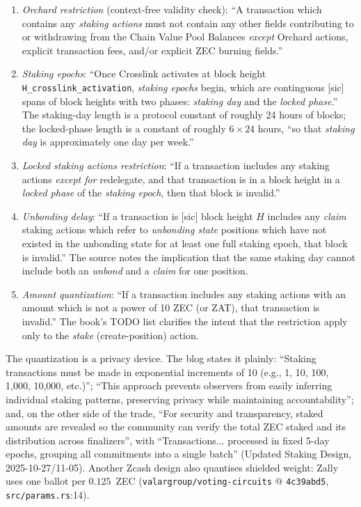 \documentclass[11pt,a4paper]{article}
\theoremstyle{definition}
\begin{document}
\begin{enumerate}
\item \emph{Orchard restriction} (context-free validity check): ``A
  transaction which contains any \emph{staking actions} must not contain
  any other fields contributing to or withdrawing from the Chain Value
  Pool Balances \emph{except} Orchard actions, explicit transaction fees,
  and/or explicit ZEC burning fields.''
\item \emph{Staking epochs}: ``Once Crosslink activates at block height
  \texttt{H\_crosslink\_activation}, \emph{staking epochs} begin, which
  are continguous [sic] spans of block heights with two phases:
  \emph{staking day} and the \emph{locked phase}.'' The staking-day length
  is a protocol constant of roughly 24 hours of blocks; the locked-phase
  length is a constant of roughly $6 \times 24$ hours, ``so that
  \emph{staking day} is approximately one day per week.''
\item \emph{Locked staking actions restriction}: ``If a transaction
  includes any staking actions \emph{except for} redelegate, and that
  transaction is in a block height in a \emph{locked phase} of the
  \emph{staking epoch}, then that block is invalid.''
\item \emph{Unbonding delay}: ``If a transaction is [sic] block height
  $H$ includes any \emph{claim} staking actions which refer to
  \emph{unbonding state} positions which have not existed in the unbonding
  state for at least one full staking epoch, that block is invalid.'' The
  source notes the implication that the same staking day cannot include
  both an \emph{unbond} and a \emph{claim} for one position.
\item \emph{Amount quantization}: ``If a transaction includes any staking
  actions with an amount which is not a power of 10 ZEC (or ZAT), that
  transaction is invalid.'' The book's TODO list clarifies the intent that
  the restriction apply only to the \emph{stake} (create-position) action.
\end{enumerate}

The quantization is a privacy device. The blog states it plainly:
``Staking transactions must be made in exponential increments of 10
(e.g., 1, 10, 100, 1,000, 10,000, etc.)''; ``This approach prevents
observers from easily inferring individual staking patterns, preserving
privacy while maintaining accountability''; and, on the other side of the
trade, ``For security and transparency, staked amounts are revealed so
the community can verify the total ZEC staked and its distribution across
finalizers'', with ``Transactions... processed in fixed 5-day epochs,
grouping all commitments into a single batch'' (Updated Staking Design,
2025-10-27/11-05). Another Zcash design also quantises shielded weight:
Zally uses one ballot per $0.125$~ZEC
(\texttt{valargroup/voting-circuits} @ \texttt{4c39abd5},
\texttt{src/params.rs}:14).
\end{document}
